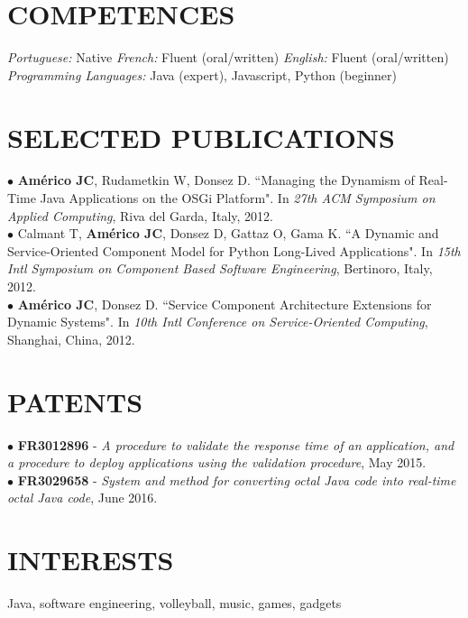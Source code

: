\documentclass[margin]{res}
\begin{document}
\begin{resume}
		\section{COMPETENCES} {\sl Portuguese:} Native \hfill {\sl French:} Fluent (oral/written) \hfill {\sl English:} Fluent (oral/written)\\
			{\sl Programming Languages:} Java (expert), Javascript, Python (beginner)\\
		\vspace{-6mm}
		\section{SELECTED PUBLICATIONS} 	
			$\bullet$ {\bf Am\'{e}rico JC}, Rudametkin W, Donsez D. ``Managing the Dynamism of Real-Time Java Applications on the OSGi Platform". In {\sl 27th ACM Symposium on Applied Computing}, Riva del Garda, Italy, 2012. 
			\vspace{1mm}\\
			$\bullet$ Calmant T, {\bf Am\'{e}rico JC}, Donsez D, Gattaz O, Gama K. ``A Dynamic and Service-Oriented Component Model for Python Long-Lived Applications". In {\sl 15th Intl Symposium on Component Based Software Engineering}, Bertinoro, Italy, 2012.
			\vspace{1mm}\\
			$\bullet$ {\bf Am\'{e}rico JC}, Donsez D. ``Service Component Architecture Extensions for Dynamic Systems". In {\sl 10th Intl Conference on Service-Oriented Computing}, Shanghai, China, 2012.
			\vspace{-2mm} 
		\section{PATENTS} 	
			$\bullet$ {\bf FR3012896} - {\sl A procedure to validate the response time of an application, and a procedure to deploy applications using the validation procedure}, May 2015.
			\vspace{1mm}\\
			$\bullet$ {\bf FR3029658} - {\sl System and method for converting octal Java code into real-time octal Java code}, June 2016.
			\vspace{-2mm} 
		\section{INTERESTS} Java, software engineering, volleyball, music, games, gadgets
	\end{resume}
\end{document}
